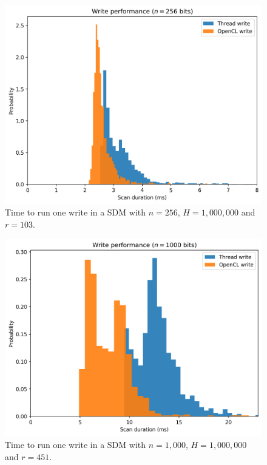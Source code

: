 \begin{figure}[!htb]
\centering\includegraphics[width=\textwidth]{images02/performance/imac-write-256.png}
\caption{Time to run one write in a SDM with $n=256$, $H=1,000,000$ and $r=103$.
\label{fig:perf-imac-write-256}}
\end{figure}

\begin{figure}[!htb]
\centering\includegraphics[width=\textwidth]{images02/performance/imac-write-1000.png}
\caption{Time to run one write in a SDM with $n=1,000$, $H=1,000,000$ and $r=451$.
\label{fig:perf-imac-write-1000}}
\end{figure}

